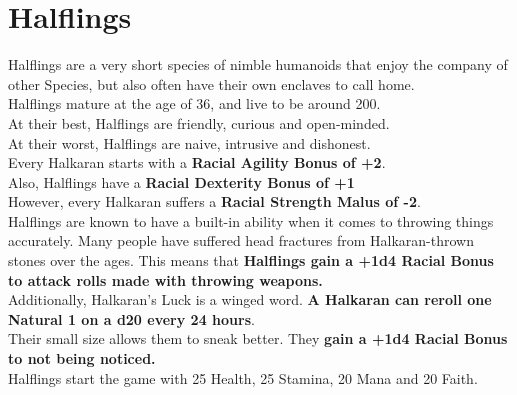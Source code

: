 \section{Halflings}\label{species:halflings}
Halflings are a very short species of nimble humanoids that enjoy the company of other Species, but also often have their own enclaves to call home.\\
Halflings mature at the age of 36, and live to be around 200.\\
At their best, Halflings are friendly, curious and open-minded.\\
At their worst, Halflings are naive, intrusive and dishonest.\\
Every Halkaran starts with a \textbf{Racial Agility Bonus of +2}.\\
Also, Halflings have a \textbf{Racial Dexterity Bonus of +1}\\
However, every Halkaran suffers a \textbf{Racial Strength Malus of -2}.\\
Halflings are known to have a built-in ability when it comes to throwing things accurately.
Many people have suffered head fractures from Halkaran-thrown stones over the ages.
This means that \textbf{Halflings gain a +1d4 Racial Bonus to attack rolls made with throwing weapons.}\\
Additionally, Halkaran's Luck is a winged word. \textbf{A Halkaran can reroll one Natural 1 on a d20 every 24 hours}.\\
Their small size allows them to sneak better.
They \textbf{gain a +1d4 Racial Bonus to not being noticed.}\\
Halflings start the game with 25 Health, 25 Stamina, 20 Mana and 20 Faith.